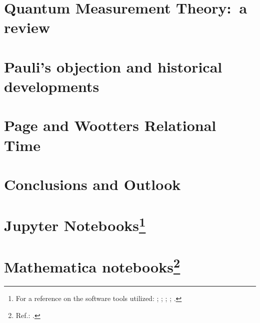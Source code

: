 \chapter{Quantum Measurement Theory:~a review}\label{ch:decohere}





%



\chapter{Pauli's objection and historical developments}\label{ch:hist}






\chapter{Page and Wootters Relational Time}\label{ch:pw}\label{ch:detect}









\chapter{Conclusions and Outlook}\label{ch:outlook}



\appendix

\chapter[Jupyter Notebooks]{Jupyter Notebooks\footnote{
  For a reference on the software tools utilized:
  \cite{comp:scipy};
  \cite{comp:sympy};
  \cite{comp:jupyter};
  \cite{comp:matplotlib};
  \cite{comp:numpy}.
}}






\chapter[Mathematica notebooks]{Mathematica notebooks\footnote{
  Ref.: \cite{Wolfram}.
}}



\printbibliography[heading=bibintoc]


